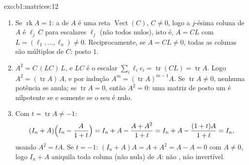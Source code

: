 \begin{solution}{exo:b1:matrices:12}
\begin{enumerate}
  \item Se $\operatorname{rk} A = 1$: a  de $A$ é uma reta $\operatorname{Vect}(C)$, $C \neq 0$, logo a
        $j$-ésima coluna de $A$ é $\ell_j\,C$ para escalares $\ell_j$
        (não todos nulos), isto é, $A = C L$ com $L = (\ell_1, \dots,
        \ell_n) \neq 0$.
        Reciprocamente, se $A = CL \neq 0$, todas as colunas são múltiplos de
        $C$: posto $1$.
  \item $A^2 = C\,(L C)\,L$, e $LC$ é o escalar $\sum_i
        \ell_i c_i = \operatorname{tr}(CL) = \operatorname{tr}
        A$. Logo $A^2 = (\operatorname{tr} A)\,A$, e por indução
        $A^m = (\operatorname{tr} A)^{m-1} A$. Se $\operatorname{tr} A \neq 0$, nenhuma potência se anula; se $\operatorname{tr} A = 0$,
        então $A^2 = 0$: uma matriz de posto um é nilpotente se e
        somente se o seu  é nulo.
  \item Com $t = \operatorname{tr} A \neq -1$:
        \[
        (I_n + A)\Bigl(I_n - \frac{A}{1 + t}\Bigr)
        = I_n + A - \frac{A + A^2}{1 + t}
        = I_n + A - \frac{(1 + t)A}{1 + t} = I_n ,
        \]
        usando $A^2 = tA$. Se $t = -1$: $(I_n + A)A = A + A^2 = A
        - A = 0$ com $A \neq 0$, logo $I_n + A$
        aniquila toda coluna (não nula) de $A$: não , não
        invertível.
\end{enumerate}
\end{solution}

